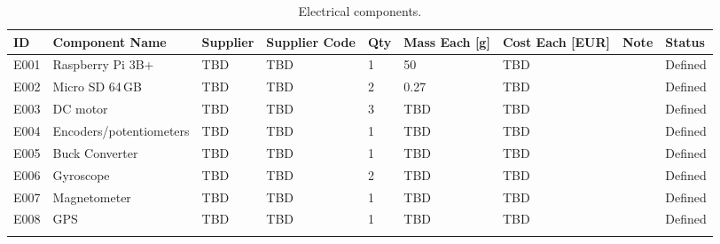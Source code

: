 

\begin{longtable}{|m{}|m{}|m{}|m{}|m{}|m{}|m{}|m{}|m{}|}

\hline
\textbf{ID} & \textbf{Component Name} & \textbf{Supplier} & \textbf{Supplier Code} & \textbf{Qty} & \textbf{Mass Each [g]} & \textbf{Cost Each [EUR]} & \textbf{Note} & \textbf{Status} \\ \hline

E001 & Raspberry Pi 3B+		& TBD & TBD & 1 & 50 	& TBD & & Defined \\\hline
E002 & Micro SD 64\,GB 		& TBD & TBD & 2 & 0.27 	& TBD & & Defined \\\hline
E003 & DC motor		 		& TBD & TBD & 3 & TBD 	& TBD & & Defined \\\hline
E004 & Encoders/potentiometers 	& TBD & TBD & 1 & TBD 	& TBD & & Defined \\\hline
E005 & Buck Converter 		& TBD & TBD & 1 & TBD 	& TBD & & Defined \\\hline
E006 & Gyroscope 			& TBD & TBD & 2 & TBD 	& TBD & & Defined \\\hline
E007 & Magnetometer 		& TBD & TBD & 1 & TBD 	& TBD & & Defined \\\hline
E008 & GPS 					& TBD & TBD & 1 & TBD 	& TBD & & Defined \\\hline



\caption{Electrical components.}
\label{tab:component-elec}
\end{longtable}
\raggedbottom